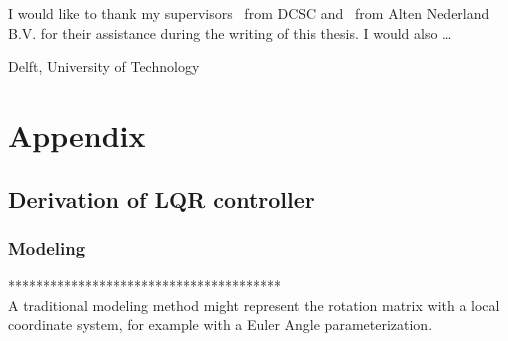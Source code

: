 \documentclass[a4paper,11pt]{mscThesis}
\begin{document}
%
\frontmatter %
%
 \maketitle
%

%
    I would like to thank my supervisors \mscreaderone\ from DCSC and \mscreadertwo\ from Alten Nederland B.V. for their assistance during the writing
    of this thesis. I would also \ldots 
    \vspace*{15mm}

    \noindent
    Delft, University of Technology \hfill \mscname\\
    \mscdate

%
    \tocloflot
%
    
    \cleardoublepage%
%
%
\mainmatter
%
%
%







%

%


	
\appendix
    \chapter{Appendix}
    
    \section{Derivation of LQR controller}
    
	    \subsection{Modeling}\label{app:model}
	    
	    ***************************************\\
	    A traditional modeling method might represent the rotation matrix with a local coordinate system, for example with a Euler Angle parameterization. 
	    
\end{document}

